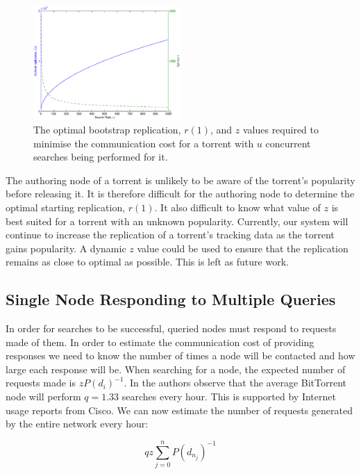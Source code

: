     \begin{figure}[t]
        \centering
        \includegraphics[width=0.5\textwidth]{Images/OptimalReplication.eps}
        \caption{The optimal bootstrap replication, $r(1)$, and $z$ values required to minimise the communication cost for a torrent with $u$ concurrent searches being performed for it.}
        \label{fig:optimal_replication}
    \end{figure}

    The authoring node of a torrent is unlikely to be aware of the torrent's popularity before releasing it. It is therefore difficult for the authoring node to determine the optimal starting replication, $r(1)$. It also difficult to know what value of $z$ is best suited for a torrent with an unknown popularity. Currently, our system will continue to increase the replication of a torrent's tracking data as the torrent gains popularity. A dynamic $z$ value could be used to ensure that the replication remains as close to optimal as possible. This is left as future work.

\subsection{Single Node Responding to Multiple Queries}

    In order for searches to be successful, queried nodes must respond to requests made of them. In order to estimate the communication cost of providing responses we need to know the number of times a node will be contacted and how large each response will be. When searching for a node, the expected number of requests made is $zP(d_i)^{-1}$. In \cite{guo_measurements_2005} the authors observe that the average BitTorrent node will perform $q=1.33$ searches every hour.  This is supported by Internet usage reports from Cisco\footnotemark. We can now estimate the number of requests generated by the entire network every hour:

    \begin{equation}
        qz\sum_{j=0}^{n}{P(d_{n_j})^{-1}}
    \end{equation}

